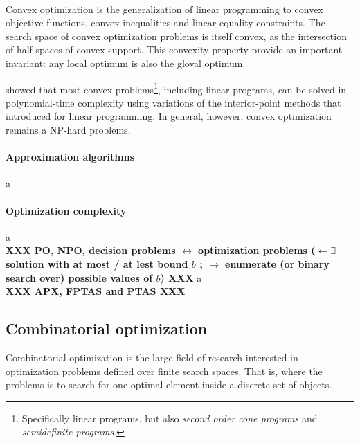 	\paragraph{}
	Convex optimization is the generalization of linear programming to convex objective functions, convex inequalities and linear equality constraints.
	The search space of convex optimization problems is itself convex, as the intersection of half-spaces of convex support.
	This convexity property provide an important invariant: any local optimum is also the gloval optimum.

	\Textcite{nesterov1994interior} showed that most convex problems\footnote{Specifically linear programs, but also \emph{second order cone programs} and \emph{semidefinite programs}.}, including linear programs, can be solved in polynomial-time complexity using variations of the interior-point methods that \textcite{karmarkar1984new} introduced for linear programming.
	In general, however, convex optimization remains a NP-hard problems.%

	\paragraph{Approximation algorithms} a\\

	\paragraph{Optimization complexity} a\\

	\textbf{XXX PO, NPO, decision problems $\leftrightarrow$ optimization problems ($\leftarrow \exists$ solution with at most / at lest bound $b$ ; $\rightarrow$ enumerate (or binary search over) possible values of $b$) XXX}
	\phantom{oarst}a\\

	\textbf{XXX APX, FPTAS and PTAS XXX}

	\subsection{Combinatorial optimization}
	\label{subsec:combio}
	Combinatorial optimization is the large field of research interested in optimization problems defined over finite search spaces.
	That is, where the problems is to search for one optimal element inside a discrete set of objects.


